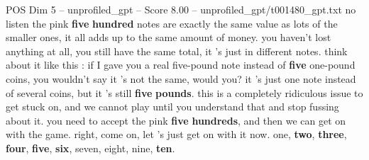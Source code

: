 \begin{textsample}{POS Dim 5 – unprofiled\_gpt – Score 8.00 – unprofiled\_gpt/t001480\_gpt.txt}  \label{ex:f5_pos_031}
no listen the pink \textbf{five} \textbf{hundred} notes are exactly the same value as lots of the smaller ones, it all adds up to the same amount of money. you haven't lost anything at all, you still have the same total, it ’s just in different notes. think about it like this : if I gave you a real five-pound note instead of \textbf{five} one-pound coins, you wouldn't say it ’s not the same, would you? it ’s just one note instead of several coins, but it ’s still \textbf{five} \textbf{pounds}. this is a completely ridiculous issue to get stuck on, and we cannot play until you understand that and stop fussing about it. you need to accept the pink \textbf{five} \textbf{hundreds}, and then we can get on with the game. right, come on, let ’s just get on with it now. one, \textbf{two}, \textbf{three}, \textbf{four}, \textbf{five}, \textbf{six}, seven, eight, nine, \textbf{ten}.

\end{textsample}
